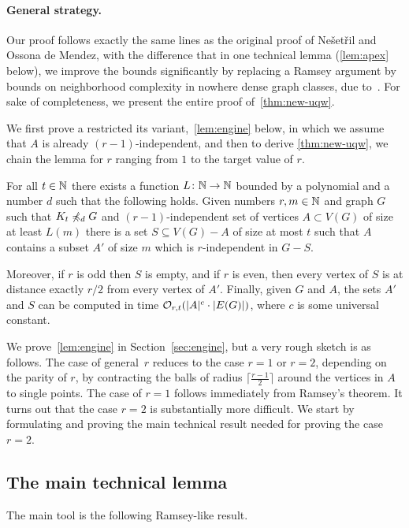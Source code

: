 \paragraph{General strategy.}
Our proof follows exactly the same lines as the original proof of Ne\v set\v ril and Ossona de Mendez, with the difference that in one technical lemma (\cref{lem:apex} below), we improve the bounds significantly by replacing a Ramsey argument by bounds on neighborhood
complexity in nowhere dense graph classes, due to~\cite{gajarsky2017kernelization}.
For sake of completeness, we present the entire proof of~\cref{thm:new-uqw}.


We first prove a restricted its variant,~\cref{lem:engine} below, in which we assume that $A$ is already $(r-1)$-independent, and then to derive
\cref{thm:new-uqw}, we 
 chain the lemma for $r$ ranging from $1$ to the target value of $r$.

\begin{lemma}\label{lem:engine}
For all $t\in \mathbb{N}$ there exists a function $L\colon \mathbb{N}\to \mathbb{N}$
bounded by a polynomial
and a number $d$ such that the following holds.
Given numbers $r,m\in \mathbb{N}$ and graph $G$ such that $K_t\not\preccurlyeq_d G$ and
$(r-1)$-independent set of vertices $A\subset V(G)$ of size at least $L(m)$ there is a set $S\subseteq V(G)-A$ of size at most $t$ such that $A$ contains a subset $A'$ of size $m$ which is $r$-independent in $G-S$.

Moreover, if $r$ is odd then $S$ is empty, and if $r$ is even,
then every vertex of $S$ is at distance exactly $ r/2$ from every vertex of $A'$.
Finally, given $G$ and $A$, the sets $A'$ and $S$ can be computed in time $\mathcal{O}_{r,t}(|A|^c\cdot |E(G)|)$, where $c$ is some universal constant.
\end{lemma}

We prove~\cref{lem:engine} in Section~\ref{sec:engine}, but  a very rough sketch is as follows.
The  case of general~$r$ reduces to the case $r=1$ or $r=2$, depending on the parity of $r$,
by contracting the balls of radius $\lceil \frac {r-1} 2\rceil $ around the vertices in $A$ to single points.
The case of $r=1$ follows immediately from Ramsey's theorem. 
It turns out that the case $r=2$ is substantially more difficult.
We start by formulating and proving the main technical result needed for proving the case $r=2$.

\subsection{The main technical lemma}
The main tool is the following Ramsey-like result.

